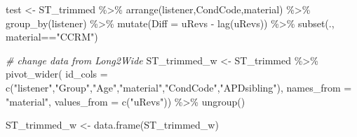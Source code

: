 \documentclass[a4paper, twoside]{templates/ociamthesis}
\newenvironment{Shaded}{\begin{snugshade}}{\end{snugshade}}
\newcommand{\AttributeTok}[1]{\textcolor[rgb]{0.77,0.63,0.00}{#1}}
\newcommand{\CommentTok}[1]{\textcolor[rgb]{0.56,0.35,0.01}{\textit{#1}}}
\newcommand{\FunctionTok}[1]{\textcolor[rgb]{0.00,0.00,0.00}{#1}}
\newcommand{\NormalTok}[1]{#1}
\newcommand{\OtherTok}[1]{\textcolor[rgb]{0.56,0.35,0.01}{#1}}
\newcommand{\SpecialCharTok}[1]{\textcolor[rgb]{0.00,0.00,0.00}{#1}}
\newcommand{\StringTok}[1]{\textcolor[rgb]{0.31,0.60,0.02}{#1}}
\renewenvironment{Shaded}
{
  \vspace{4pt}%
  \begin{snugshade}%
}{%
  \end{snugshade}%
  \vspace{4pt}%
}
\begin{document}
\begin{Shaded}
\begin{Highlighting}[]
\NormalTok{test }\OtherTok{\textless{}{-}}\NormalTok{ ST\_trimmed }\SpecialCharTok{\%\textgreater{}\%} 
  \FunctionTok{arrange}\NormalTok{(listener,CondCode,material) }\SpecialCharTok{\%\textgreater{}\%} 
    \FunctionTok{group\_by}\NormalTok{(listener) }\SpecialCharTok{\%\textgreater{}\%}
    \FunctionTok{mutate}\NormalTok{(}\AttributeTok{Diff =}\NormalTok{ uRevs }\SpecialCharTok{{-}} \FunctionTok{lag}\NormalTok{(uRevs)) }\SpecialCharTok{\%\textgreater{}\%} 
  \FunctionTok{subset}\NormalTok{(., material}\SpecialCharTok{==}\StringTok{"CCRM"}\NormalTok{)}

\CommentTok{\# change data from Long2Wide}
\NormalTok{ST\_trimmed\_w }\OtherTok{\textless{}{-}}\NormalTok{ ST\_trimmed }\SpecialCharTok{\%\textgreater{}\%}
  \FunctionTok{pivot\_wider}\NormalTok{(}
    \AttributeTok{id\_cols =} \FunctionTok{c}\NormalTok{(}\StringTok{"listener"}\NormalTok{,}\StringTok{"Group"}\NormalTok{,}\StringTok{"Age"}\NormalTok{,}\StringTok{"material"}\NormalTok{,}\StringTok{"CondCode"}\NormalTok{,}\StringTok{"APDsibling"}\NormalTok{),}
    \AttributeTok{names\_from =} \StringTok{"material"}\NormalTok{,}
    \AttributeTok{values\_from =} \FunctionTok{c}\NormalTok{(}\StringTok{"uRevs"}\NormalTok{)) }\SpecialCharTok{\%\textgreater{}\%}
  \FunctionTok{ungroup}\NormalTok{()}

\NormalTok{ST\_trimmed\_w }\OtherTok{\textless{}{-}} \FunctionTok{data.frame}\NormalTok{(ST\_trimmed\_w)}


\end{Highlighting}
\end{Shaded}
\end{document}
